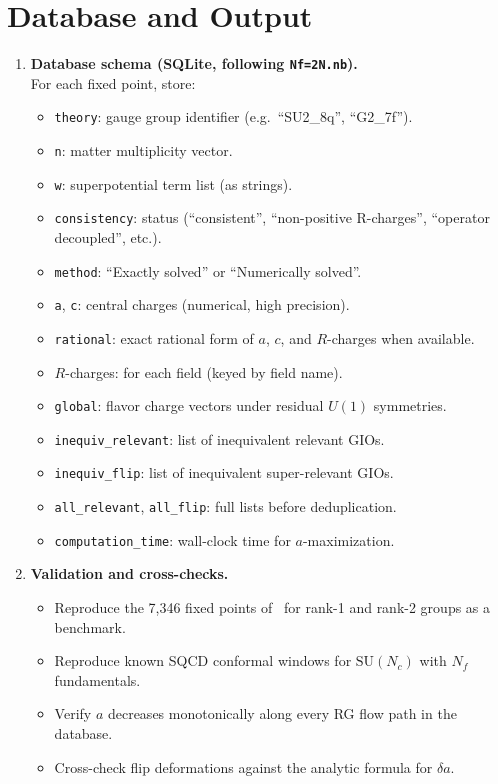 \documentclass[12pt]{article}
\begin{document}
\section{Database and Output}

\begin{enumerate}[label=\textbf{6.\arabic*}]

\item \textbf{Database schema (SQLite, following \texttt{Nf=2N.nb}).} \\
  For each fixed point, store:
  \begin{itemize}
    \item \texttt{theory}: gauge group identifier (e.g.\ ``SU2\_8q'', ``G2\_7f'').
    \item \texttt{n}: matter multiplicity vector.
    \item \texttt{w}: superpotential term list (as strings).
    \item \texttt{consistency}: status (``consistent'', ``non-positive R-charges'', ``operator decoupled'', etc.).
    \item \texttt{method}: ``Exactly solved'' or ``Numerically solved''.
    \item \texttt{a}, \texttt{c}: central charges (numerical, high precision).
    \item \texttt{rational}: exact rational form of $a$, $c$, and $R$-charges when available.
    \item $R$-charges: for each field (keyed by field name).
    \item \texttt{global}: flavor charge vectors under residual $U(1)$ symmetries.
    \item \texttt{inequiv\_relevant}: list of inequivalent relevant GIOs.
    \item \texttt{inequiv\_flip}: list of inequivalent super-relevant GIOs.
    \item \texttt{all\_relevant}, \texttt{all\_flip}: full lists before deduplication.
    \item \texttt{computation\_time}: wall-clock time for $a$-maximization.
  \end{itemize}

\item \textbf{Validation and cross-checks.} \\
  \begin{itemize}
    \item Reproduce the 7,346 fixed points of~\cite{CMNS} for rank-1 and rank-2 groups as a benchmark.
    \item Reproduce known SQCD conformal windows for $\mathrm{SU}(N_c)$ with $N_f$ fundamentals.
    \item Verify $a$ decreases monotonically along every RG flow path in the database.
    \item Cross-check flip deformations against the analytic formula for $\delta a$.
  \end{itemize}


\end{enumerate}
\end{document}
